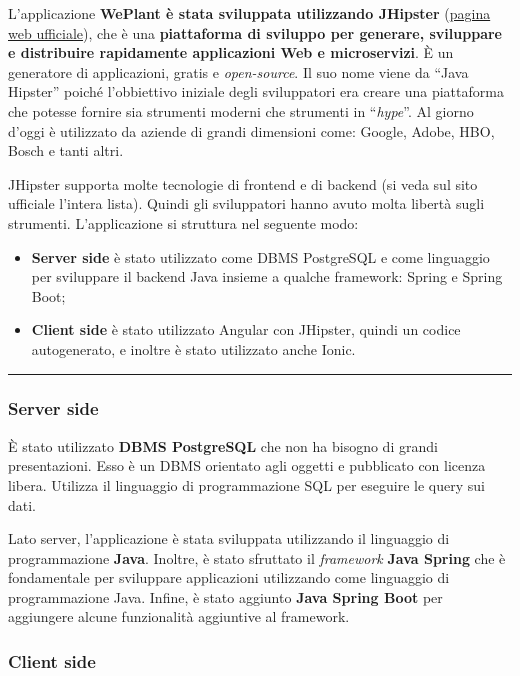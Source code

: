 \documentclass[a4paper]{article}
\newcommand{\longline}{\noindent\rule{\textwidth}{0.4pt}}
\newcommand{\dquotes}[1]{``#1''}
\begin{document}
	L'applicazione \textbf{WePlant è stata sviluppata utilizzando JHipster} (\href{https://www.jhipster.tech/}{pagina web ufficiale}), che è una \textbf{piattaforma di sviluppo per generare, sviluppare e distribuire rapidamente applicazioni Web e microservizi}. È un generatore di applicazioni, gratis e \emph{open-source}. Il suo nome viene da \dquotes{Java Hipster} poiché l'obbiettivo iniziale degli sviluppatori era creare una piattaforma che potesse fornire sia strumenti moderni che strumenti in \dquotes{\emph{hype}}. Al giorno d'oggi è utilizzato da aziende di grandi dimensioni come: Google, Adobe, HBO, Bosch e tanti altri.\newline
	
	\noindent
	JHipster supporta molte tecnologie di frontend e di backend (si veda sul sito ufficiale l'intera lista). Quindi gli sviluppatori hanno avuto molta libertà sugli strumenti. L'applicazione si struttura nel seguente modo:
	\begin{itemize}
		\item \textbf{Server side} è stato utilizzato come DBMS PostgreSQL e come linguaggio per sviluppare il backend Java insieme a qualche framework: Spring e Spring Boot;
		
		\item \textbf{Client side} è stato utilizzato Angular con JHipster, quindi un codice autogenerato, e inoltre è stato utilizzato anche Ionic.
	\end{itemize}
	
	\longline
	
	\subsubsection{Server side}
	
	È stato utilizzato \textbf{DBMS PostgreSQL} che non ha bisogno di grandi presentazioni. Esso è un DBMS orientato agli oggetti e pubblicato con licenza libera. Utilizza il linguaggio di programmazione SQL per eseguire le query sui dati.\newline
	
	\noindent
	Lato server, l'applicazione è stata sviluppata utilizzando il linguaggio di programmazione \textbf{Java}. Inoltre, è stato sfruttato il \emph{framework} \textbf{Java Spring} che è fondamentale per sviluppare applicazioni utilizzando come linguaggio di programmazione Java. Infine, è stato aggiunto \textbf{Java Spring Boot} per aggiungere alcune funzionalità aggiuntive al framework.\newpage
	
	\subsubsection{Client side}
	
\end{document}
